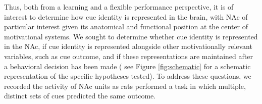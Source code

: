 \documentclass[11pt]{article}
\providecommand{\DIFadd}[1]{{\protect\color{red} \sf #1}} %
\providecommand{\DIFdel}[1]{} %
\providecommand{\DIFaddbegin}{} %
\providecommand{\DIFaddend}{} %
\providecommand{\DIFdelbegin}{} %
\providecommand{\DIFdelend}{} %
\newcommand{\DIFscaledelfig}{0.5}
\newlength{\DIFdelgraphicswidth} %
\newlength{\DIFdelgraphicsheight} %
\newcommand{\DIFaddincludegraphics}[2][]{{\color{red}\fbox{\DIFOincludegraphics[#1]{#2}}}} %
\newcommand{\DIFdelincludegraphics}[2][]{%
\sbox{\DIFdelgraphicsbox}{\DIFOincludegraphics[#1]{#2}}%
\settoboxwidth{\DIFdelgraphicswidth}{\DIFdelgraphicsbox} %
\settoboxtotalheight{\DIFdelgraphicsheight}{\DIFdelgraphicsbox} %
\scalebox{\DIFscaledelfig}{%
\parbox[b]{\DIFdelgraphicswidth}{\usebox{\DIFdelgraphicsbox}\\[-\baselineskip] \rule{\DIFdelgraphicswidth}{0em}}\llap{\resizebox{\DIFdelgraphicswidth}{\DIFdelgraphicsheight}{%
\setlength{\unitlength}{\DIFdelgraphicswidth}%
\begin{picture}(1,1)%
\thicklines\linethickness{2pt} %
{\color[rgb]{1,0,0}\put(0,0){\framebox(1,1){}}}%
{\color[rgb]{1,0,0}\put(0,0){\line( 1,1){1}}}%
{\color[rgb]{1,0,0}\put(0,1){\line(1,-1){1}}}%
\end{picture}%
}\hspace*{3pt}}} %
} %
\DeclareRobustCommand{\DIFaddbegin}{\DIFOaddbegin \let\includegraphics\DIFaddincludegraphics} %
\DeclareRobustCommand{\DIFaddend}{\DIFOaddend \let\includegraphics\DIFOincludegraphics} %
\DeclareRobustCommand{\DIFdelbegin}{\DIFOdelbegin \let\includegraphics\DIFdelincludegraphics} %
\DeclareRobustCommand{\DIFdelend}{\DIFOaddend \let\includegraphics\DIFOincludegraphics} %
\begin{document}
Thus, both from a learning and a flexible performance perspective, it
is of interest to determine how cue identity is represented in the
brain, with NAc of particular interest given its anatomical and
functional position at the center of motivational systems. We sought
to determine whether cue identity is represented in the NAc, if cue
identity is represented alongside other motivationally relevant
variables, such as cue \DIFdelbegin \DIFdel{value}\DIFdelend \DIFaddbegin \DIFadd{outcome}\DIFaddend , and if these representations are
maintained after a behavioral decision has been made (\DIFdelbegin \DIFdel{Figure
\ref{fig:schematic}}\DIFdelend \DIFaddbegin \DIFadd{see Figure
\ref{fig:schematic} for a schematic representation of the specific hypotheses tested}\DIFaddend ). To address these questions, we recorded the
activity of NAc units as rats performed a task in which multiple,
distinct sets of cues predicted the same outcome.
\end{document}
